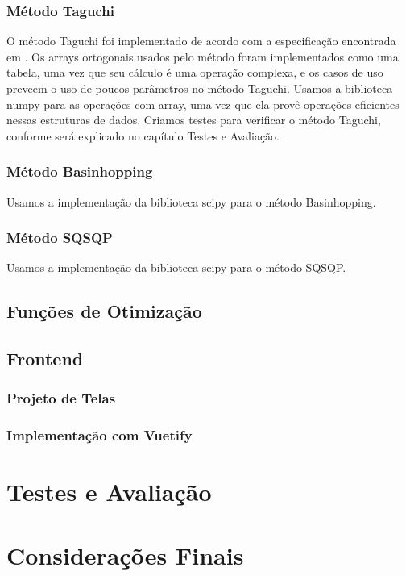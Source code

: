 \documentclass[]{politex}
\begin{document}
\subsection{Método Taguchi}
O método Taguchi foi implementado de acordo com a especificação encontrada em \cite{taguchi}.
Os arrays ortogonais usados pelo método foram implementados como uma tabela,
uma vez que seu cálculo é uma operação complexa, e os casos de uso preveem o uso
de poucos parâmetros no método Taguchi.
Usamos a biblioteca numpy para as operações com array, uma vez que ela provê
operações eficientes nessas estruturas de dados.
Criamos testes para verificar o método Taguchi, conforme será explicado no
capítulo Testes e Avaliação.

\subsection{Método Basinhopping}
Usamos a implementação da biblioteca scipy para o método Basinhopping.

\subsection{Método SQSQP}
Usamos a implementação da biblioteca scipy para o método SQSQP.

\section{Funções de Otimização}


\section{Frontend}
\subsection{Projeto de Telas}
\subsection{Implementação com Vuetify}

\chapter{Testes e Avaliação}


\chapter{Considerações Finais}
\end{document}
